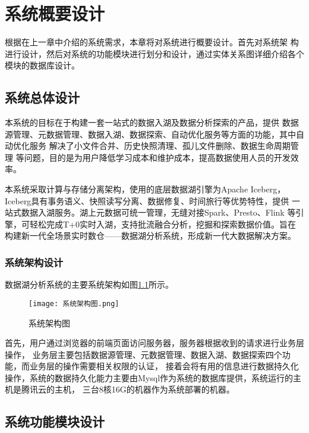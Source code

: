 
\chapter{系统概要设计}

根据在上一章中介绍的系统需求，本章将对系统进行概要设计。首先对系统架
构进行设计，然后对系统的功能模块进行划分和设计，通过实体关系图详细介绍各个模块的数据库设计。

\section{系统总体设计}

本系统的目标在于构建一套一站式的数据入湖及数据分析探索的产品，提供
数据源管理、元数据管理、数据入湖、数据探索、自动优化服务等方面的功能，其中自动优化服务
解决了小文件合并、历史快照清理、孤儿文件删除、数据生命周期管理
等问题，目的是为用户降低学习成本和维护成本，提高数据使用人员的开发效率。

本系统采取计算与存储分离架构，使用的底层数据湖引擎为Apache Iceberg，
Iceberg具有事务语义、快照读写分离、数据修复、时间旅行等优势特性，提供
一站式数据入湖服务。湖上元数据可统一管理，无缝对接Spark、Presto、Flink
等引擎，可轻松完成T+0实时入湖，支持批流融合分析，挖掘和探索数据价值。旨在
构建新一代全场景实时数仓——数据湖分析系统，形成新一代大数据解决方案。

\subsection{系统架构设计}

数据湖分析系统的主要系统架构如图\ref{fig:系统架构图}所示。

\begin{figure}[H]
  \centering
  \texttt{[image: 系统架构图.png]}
  \caption{系统架构图}
  \label{fig:系统架构图}
\end{figure}

首先，用户通过浏览器的前端页面访问服务器，服务器根据收到的请求进行业务层操作，
业务层主要包括数据源管理、元数据管理、数据入湖、数据探索四个功能，而业务层的操作需要相关权限的认证，
接着会将有用的信息进行数据持久化操作，系统的数据持久化能力主要由Mysql作为系统的数据库提供，系统运行的主机是腾讯云的主机，
三台8核16G的机器作为系统部署的机器。

\section{系统功能模块设计}

